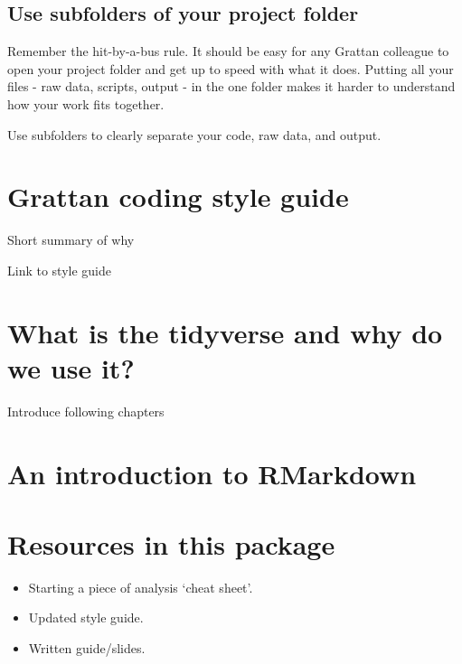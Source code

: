 \documentclass[]{book}
\providecommand{\tightlist}{%
  \setlength{\itemsep}{0pt}\setlength{\parskip}{0pt}}
\begin{document}
\hypertarget{use-subfolders-of-your-project-folder}{%
\subsection{Use subfolders of your project folder}\label{use-subfolders-of-your-project-folder}}

Remember the hit-by-a-bus rule. It should be easy for any Grattan colleague to open your project folder and get up to speed with what it does. Putting all your files - raw data, scripts, output - in the one folder makes it harder to understand how your work fits together.

Use subfolders to clearly separate your code, raw data, and output.

\hypertarget{grattan-coding-style-guide}{%
\section{Grattan coding style guide}\label{grattan-coding-style-guide}}

Short summary of why

Link to style guide

\hypertarget{what-is-the-tidyverse-and-why-do-we-use-it}{%
\section{What is the tidyverse and why do we use it?}\label{what-is-the-tidyverse-and-why-do-we-use-it}}

Introduce following chapters

\hypertarget{an-introduction-to-rmarkdown}{%
\section{An introduction to RMarkdown}\label{an-introduction-to-rmarkdown}}

\hypertarget{resources-in-this-package}{%
\section{Resources in this package}\label{resources-in-this-package}}

\begin{itemize}
\tightlist
\item
  Starting a piece of analysis `cheat sheet'.
\item
  Updated style guide.
\item
  Written guide/slides.
\end{itemize}
\end{document}

